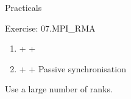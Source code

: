 \documentclass[aspectratio=43]{beamer}
\begin{document}
\begin{frame}{Practicals}
    \begin{brown2block}{Exercise: 07.MPI\_RMA}
    \begin{enumerate}
        \item {} +  + 
        \item {} +  + Passive synchronisation
    \end{enumerate}
        Use a large number of ranks.
    \end{brown2block}
\end{frame}



\end{document}
